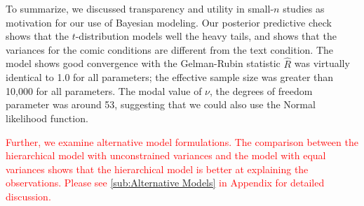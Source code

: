

To summarize, we discussed transparency and utility in small-$n$ studies as motivation for our use of Bayesian modeling. Our posterior predictive check shows that the $t$-distribution models well the heavy tails, and shows that the variances for the comic conditions are different from the text condition. The model shows good convergence with the Gelman-Rubin statistic $\hat{R}$ was virtually identical to 1.0 for all parameters; the effective sample size was greater than 10,000 for all parameters. The modal value of $\nu$, the degrees of freedom parameter was around 53, suggesting that we could also use the Normal likelihood function. 

\textcolor{red}{Further, we examine alternative model formulations. The comparison between the hierarchical model with unconstrained variances and the model with equal variances shows that the hierarchical model is better at explaining the observations. Please see \ref{sub:Alternative Models} in Appendix for detailed discussion.}
